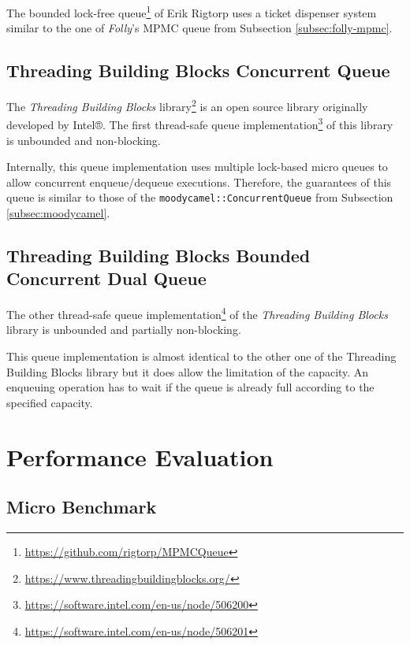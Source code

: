 	The bounded lock-free queue\footnote{\url{https://github.com/rigtorp/MPMCQueue}} of Erik Rigtorp uses a ticket dispenser system similar to the one of \textit{Folly}'s MPMC queue from Subsection \ref{subsec:folly-mpmc}.

\subsection[TBB Concurrent Queue]{Threading Building Blocks Concurrent Queue} \label{subsec:intel-bounded}%

	The \textit{Threading Building Blocks} library\footnote{\url{https://www.threadingbuildingblocks.org/}} is an open source library originally developed by Intel®. The first thread-safe queue implementation\footnote{\url{https://software.intel.com/en-us/node/506200}} of this library is unbounded and non-blocking.
	
	Internally, this queue implementation uses multiple lock-based micro queues to allow concurrent enqueue/dequeue executions. Therefore, the guarantees of this queue is similar to those of the \lstinline{moodycamel::ConcurrentQueue} from Subsection \ref{subsec:moodycamel}.

\subsection[TBB Bounded Concurrent Queue]{Threading Building Blocks Bounded Concurrent Dual Queue} \label{subsec:intel-unbounded}%

	The other thread-safe queue implementation\footnote{\url{https://software.intel.com/en-us/node/506201}} of the \textit{Threading Building Blocks} library is unbounded and partially non-blocking.
	
	This queue implementation is almost identical to the other one of the Threading Building Blocks library but it does allow the limitation of the capacity. An enqueuing operation has to wait if the queue is already full according to the specified capacity.

\section[Performance Evaluation]{Performance Evaluation} \label{sec:free-list-performance}

\subsection[Micro Benchmark]{Micro Benchmark}

